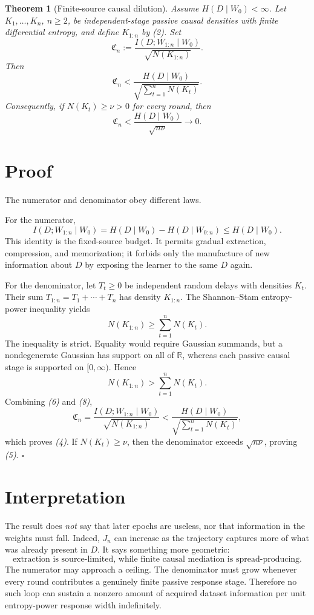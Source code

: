 \documentclass[10pt]{article}
\theoremstyle{compact}
\newtheorem{theorem}{Theorem}
\newcommand{\EP}{N}
\newcommand{\C}{\mathfrak C}
\begin{document}
\begin{theorem}[Finite-source causal dilution]
Assume $H(D\mid W_0)<\infty$. Let $K_1,\ldots,K_n$, $n\ge2$, be independent-stage passive causal densities with finite differential entropy, and define $K_{1:n}$ by \emph{(2)}. Set
\[
\C_n:=\frac{I(D;W_{1:n}\mid W_0)}{\sqrt{\EP(K_{1:n})}}.
\]
Then
\[
\boxed{
\C_n<
\frac{H(D\mid W_0)}
{\sqrt{\displaystyle\sum_{t=1}^{n}\EP(K_t)}}.}
\tag{4}
\]
Consequently, if $\EP(K_t)\ge\nu>0$ for every round, then
\[
\boxed{
\C_n<\frac{H(D\mid W_0)}{\sqrt{n\nu}}
\longrightarrow0.}
\tag{5}
\]
\end{theorem}

\newpage
\section*{Proof}
The numerator and denominator obey different laws.

For the numerator,
\[
I(D;W_{1:n}\mid W_0)
=H(D\mid W_0)-H(D\mid W_{0:n})
\le H(D\mid W_0).
\tag{6}
\]
This identity is the fixed-source budget. It permits gradual extraction, compression, and memorization; it forbids only the manufacture of new information about $D$ by exposing the learner to the same $D$ again.

For the denominator, let $T_t\ge0$ be independent random delays with densities $K_t$. Their sum $T_{1:n}=T_1+\cdots+T_n$ has density $K_{1:n}$. The Shannon--Stam entropy-power inequality yields
\[
\EP(K_{1:n})\ge\sum_{t=1}^{n}\EP(K_t).
\tag{7}
\]
The inequality is strict. Equality would require Gaussian summands, but a nondegenerate Gaussian has support on all of $\mathbb R$, whereas each passive causal stage is supported on $[0,\infty)$. Hence
\[
\EP(K_{1:n})>\sum_{t=1}^{n}\EP(K_t).
\tag{8}
\]
Combining \emph{(6)} and \emph{(8)},
\[
\C_n
=\frac{I(D;W_{1:n}\mid W_0)}{\sqrt{\EP(K_{1:n})}}
<\frac{H(D\mid W_0)}
{\sqrt{\sum_{t=1}^{n}\EP(K_t)}},
\]
which proves \emph{(4)}. If $\EP(K_t)\ge\nu$, then the denominator exceeds $\sqrt{n\nu}$, proving \emph{(5)}. \hfill$\square$

\section*{Interpretation}
The result does \emph{not} say that later epochs are useless, nor that information in the weights must fall. Indeed, $J_n$ can increase as the trajectory captures more of what was already present in $D$. It says something more geometric:
\[
\boxed{\text{extraction is source-limited, while finite causal mediation is spread-producing.}}
\]
The numerator may approach a ceiling. The denominator must grow whenever every round contributes a genuinely finite passive response stage. Therefore no such loop can sustain a nonzero amount of acquired dataset information per unit entropy-power response width indefinitely.
\end{document}
